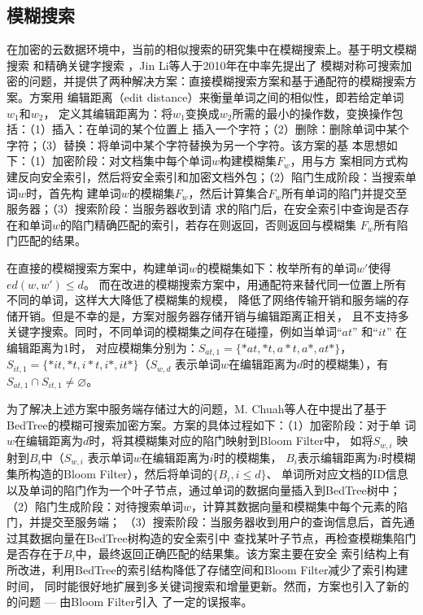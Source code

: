 \subsection{模糊搜索}
\label{sec:search_symm_symm_fuzzy}

在加密的云数据环境中，当前的相似搜索的研究集中在模糊搜索上。基于明文模糊搜索\cite{ji2009efficient}
\cite{li2008efficient} \cite{behm2009space} 和精确关键字搜索\cite{curtmola2006searchable}
\cite{chang2005privacy} \cite{jin2012reducing}，Jin Li等人于2010年在\cite{li2010fuzzy}中率先提出了
模糊对称可搜索加密的问题，并提供了两种解决方案：直接模糊搜索方案和基于通配符的模糊搜索方案。方案用
编辑距离（edit distance\cite{ristad1998learning}）来衡量单词之间的相似性，即若给定单词$w_1$和$w_2$，
定义其编辑距离为：将$w_1$变换成$w_2$所需的最小的操作数，变换操作包括：（1）插入：在单词的某个位置上
插入一个字符；（2）删除：删除单词中某个字符；（3）替换：将单词中某个字符替换为另一个字符。该方案的基
本思想如下：（1）加密阶段：对文档集中每个单词$w$构建模糊集$F_w$，用与\cite{curtmola2006searchable}方
案相同方式构建反向安全索引，然后将安全索引和加密文档外包；（2）陷门生成阶段：当搜索单词$w$时，首先构
建单词$w$的模糊集$F_w$，然后计算集合$F_w$所有单词的陷门并提交至服务器；（3）搜索阶段：当服务器收到请
求的陷门后，在安全索引中查询是否存在和单词$w$的陷门精确匹配的索引，若存在则返回，否则返回与模糊集
$F_w$所有陷门匹配的结果。

在直接的模糊搜索方案中，构建单词$w$的模糊集如下：枚举所有的单词$w'$使得$ed(w,w') \leq d$。
而在改进的模糊搜索方案中，用通配符来替代同一位置上所有不同的单词，这样大大降低了模糊集的规模，
降低了网络传输开销和服务端的存储开销。但是不幸的是，方案对服务器存储开销与编辑距离正相关，
且不支持多关键字搜索。同时，不同单词的模糊集之间存在碰撞，例如当单词$“at”$ 和$“it”$ 在编辑距离为1时，
对应模糊集分别为：$S_{at,1}=\{*at,*t,a*t,a*,at*\}$， $S_{it,1}= \{*it,*t,i*t,i*,it* \}$（$S_{w,d}$
表示单词$w$在编辑距离为$d$时的模糊集），有$S_{at,1} \cap  S_{it,1} \neq \varnothing $。

为了解决上述方案中服务端存储过大的问题，M. Chuah等人在\cite{chuah2011privacy}中提出了基于
BedTree\cite{zhang2010bed}的模糊可搜索加密方案。方案的具体过程如下：（1）加密阶段：对于单
词$w$在编辑距离为$d$时，将其模糊集对应的陷门映射到Bloom Filter中，
如将$S_{w,i}$ 映射到$B_i$中（$S_{w,i}$ 表示单词$w$在编辑距离为$i$时的模糊集，
$B_i$表示编辑距离为$i$时模糊集所构造的Bloom Filter），然后将单词的$ \{B_i, i \leq d \}$、
单词所对应文档的ID信息以及单词的陷门作为一个叶子节点，通过单词的数据向量插入到BedTree树中；
（2）陷门生成阶段：对待搜索单词$w$，计算其数据向量和模糊集中每个元素的陷门，并提交至服务端；
（3）搜索阶段：当服务器收到用户的查询信息后，首先通过其数据向量在BedTree树构造的安全索引中
查找某叶子节点，再检查模糊集陷门是否存在于$B_i$中，最终返回正确匹配的结果集。该方案主要在安全
索引结构上有所改进，利用BedTree的索引结构降低了存储空间和Bloom Filter减少了索引构建时间，
同时能很好地扩展到多关键词搜索和增量更新。然而，方案也引入了新的的问题 --- 由Bloom Filter引入
了一定的误报率。

